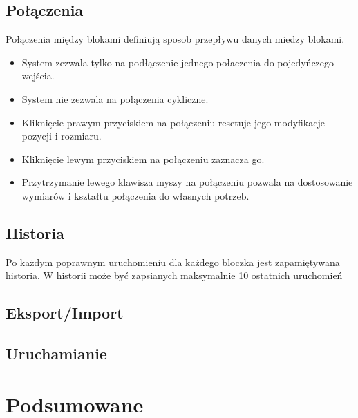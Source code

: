 \documentclass[a4paper,10pt]{article}
\begin{document}
\subsection{Połączenia}
Połączenia między blokami definiują sposob przepływu danych miedzy blokami.
\begin{itemize}
 \item System zezwala tylko na podłączenie jednego połaczenia do pojedyńczego wejścia.
 \item System nie zezwala na połączenia cykliczne.
 \item Kliknięcie prawym przyciskiem na połączeniu resetuje jego modyfikacje pozycji i rozmiaru.
 \item Kliknięcie lewym przyciskiem na połączeniu zaznacza go.
 \item Przytrzymanie lewego klawisza myszy na połączeniu pozwala na dostosowanie wymiarów i kształtu połączenia do własnych potrzeb.
\end{itemize}

\subsection{Historia}
Po każdym poprawnym uruchomieniu dla każdego bloczka jest zapamiętywana historia. W historii może być zapsianych maksymalnie 10 ostatnich uruchomień 
\subsection{Eksport/Import}
\subsection{Uruchamianie}
\section{Podsumowane}
\end{document}
